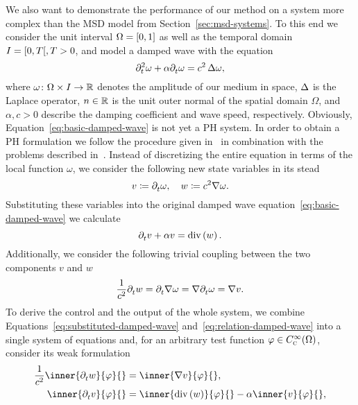 We also want to demonstrate the performance of our method on a system more complex than the \ac{MSD} model from Section~\ref{sec:msd-systems}.
To this end we consider the unit interval $\Omega = \interval{0}{1}$ as well as the temporal domain $I = \interval[open right]{0}{T}, T > 0$, and model a damped wave with the equation
\begin{equation}\label{eq:basic-damped-wave}
    \pd[t]{2} \omega + \alpha \pd[t]{} \omega = c^2 \lapl[\omega],
\end{equation}
where $\omega \colon \Omega \times I \to \bb{R}$ denotes the amplitude of our medium in space, $\lapl$ is the Laplace operator, $n \in \bb{R}$ is the unit outer normal of the spatial domain $\Omega$, and $\alpha, c > 0$ describe the damping coefficient and wave speed, respectively.
Obviously, Equation~\eqref{eq:basic-damped-wave} is not yet a \ac{PH} system.
In order to obtain a \ac{PH} formulation we follow the procedure given in~\cite{Serhani2019_2, HMS2022} in combination with the problems described in~\cite{Brugnoli2021, Poussot2023}.
Instead of discretizing the entire equation in terms of the local function $\omega$, we consider the following new state variables in its stead
\begin{equation*}
    v \coloneqq \pd[t]{} \omega,\quad w \coloneqq c^2 \nabla \omega.
\end{equation*}
Substituting these variables into the original damped wave equation~\eqref{eq:basic-damped-wave} we calculate
\begin{equation}\label{eq:substituted-damped-wave}
    \pd[t]{} v + \alpha v = \dvg{w}.
\end{equation}
Additionally, we consider the following trivial coupling between the two components $v$ and $w$
\begin{equation}\label{eq:relation-damped-wave}
    \frac{1}{c^2} \pd[t]{} w = \pd[t]{} \nabla \omega = \nabla \pd[t]{} \omega = \nabla v.
\end{equation}
To derive the control and the output of the whole system, we combine Equations~\eqref{eq:substituted-damped-wave} and~\eqref{eq:relation-damped-wave} into a single system of equations and, for an arbitrary test function $\varphi \in C_\msc{c}^\infty(\Omega)$, consider its weak formulation
\begin{equation*}
    \begin{aligned}
        \frac{1}{c^2} \inner{\pd[t]{} w}{\varphi}{} &= \inner{\nabla v}{\varphi}{}, \\
        \inner{\pd[t]{} v}{\varphi}{} &= \inner{\dvg{w}}{\varphi}{} - \alpha \inner{v}{\varphi}{},
    \end{aligned}
\end{equation*}
